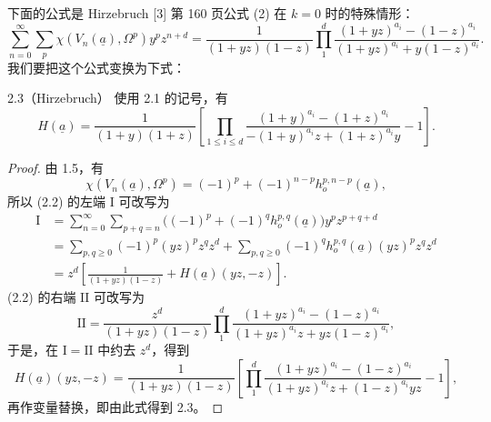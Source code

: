 下面的公式是 Hirzebruch [3] 第 160 页公式 (2) 在 $k=0$ 时的特殊情形：
\[
\sum_{n=0}^{\infty}\sum_p\chi(V_n(\underline a),\Omega^p)y^pz^{n+d}
=\frac{1}{(1+yz)(1-z)}\prod_{1}^{d}\frac{(1+yz)^{a_i}-(1-z)^{a_i}}{(1+yz)^{a_i}+y(1-z)^{a_i}}.\tag{2.2}
\]
我们要把这个公式变换为下式：
\begin{SGAresult}{}{2.3（Hirzebruch）}
使用 2.1 的记号，有
\[
H(\underline a)=\frac{1}{(1+y)(1+z)}\left[\prod_{1\leq i\leq d}\frac{(1+y)^{a_i}-(1+z)^{a_i}}{-(1+y)^{a_i}z+(1+z)^{a_i}y}-1\right].
\]
\end{SGAresult}
\begin{proof}
由 1.5，有
\[
\chi(V_n(\underline a),\Omega^p)=(-1)^p+(-1)^{n-p}h_o^{p,n-p}(\underline a),
\]
所以 (2.2) 的左端 $\mathrm I$ 可改写为
\[
\begin{aligned}
\mathrm I
&=\sum_{n=0}^{\infty}\sum_{p+q=n}\bigl((-1)^p+(-1)^qh_o^{p,q}(\underline a)\bigr)y^pz^{p+q+d}\\
&=\sum_{p,q\geq0}(-1)^p(yz)^pz^qz^d+\sum_{p,q\geq0}(-1)^qh_o^{p,q}(\underline a)(yz)^pz^qz^d\\
&=z^d\left[\frac{1}{(1+yz)(1-z)}+H(\underline a)(yz,-z)\right].
\end{aligned}
\]
(2.2) 的右端 $\mathrm {II}$ 可改写为
\[
\mathrm {II}=\frac{z^d}{(1+yz)(1-z)}\prod_1^d\frac{(1+yz)^{a_i}-(1-z)^{a_i}}{(1+yz)^{a_i}z+yz(1-z)^{a_i}},
\]
于是，在 $\mathrm I=\mathrm {II}$ 中约去 $z^d$，得到
\[
H(\underline a)(yz,-z)=\frac{1}{(1+yz)(1-z)}\left[\prod_1^d\frac{(1+yz)^{a_i}-(1-z)^{a_i}}{(1+yz)^{a_i}z+(1-z)^{a_i}yz}-1\right],
\]
再作变量替换，即由此式得到 2.3。
\end{proof}

